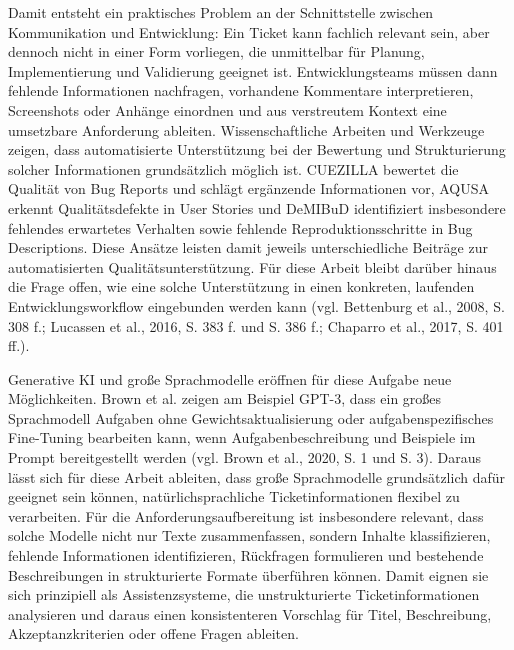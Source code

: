 \documentclass[12pt,a4paper,oneside]{scrreprt}
\begin{document}
Damit entsteht ein praktisches Problem an der Schnittstelle zwischen Kommunikation und Entwicklung: Ein Ticket kann fachlich relevant sein, aber dennoch nicht in einer Form vorliegen, die unmittelbar für Planung, Implementierung und Validierung geeignet ist. Entwicklungsteams müssen dann fehlende Informationen nachfragen, vorhandene Kommentare interpretieren, Screenshots oder Anhänge einordnen und aus verstreutem Kontext eine umsetzbare Anforderung ableiten. Wissenschaftliche Arbeiten und Werkzeuge zeigen, dass automatisierte Unterstützung bei der Bewertung und Strukturierung solcher Informationen grundsätzlich möglich ist. CUEZILLA bewertet die Qualität von Bug Reports und schlägt ergänzende Informationen vor, AQUSA erkennt Qualitätsdefekte in User Stories und DeMIBuD identifiziert insbesondere fehlendes erwartetes Verhalten sowie fehlende Reproduktionsschritte in Bug Descriptions. Diese Ansätze leisten damit jeweils unterschiedliche Beiträge zur automatisierten Qualitätsunterstützung. Für diese Arbeit bleibt darüber hinaus die Frage offen, wie eine solche Unterstützung in einen konkreten, laufenden Entwicklungsworkflow eingebunden werden kann (vgl. Bettenburg et al., 2008, S. 308 f.; Lucassen et al., 2016, S. 383 f. und S. 386 f.; Chaparro et al., 2017, S. 401 ff.).

Generative KI und große Sprachmodelle eröffnen für diese Aufgabe neue Möglichkeiten. Brown et al. zeigen am Beispiel GPT-3, dass ein großes Sprachmodell Aufgaben ohne Gewichtsaktualisierung oder aufgabenspezifisches Fine-Tuning bearbeiten kann, wenn Aufgabenbeschreibung und Beispiele im Prompt bereitgestellt werden (vgl. Brown et al., 2020, S. 1 und S. 3). Daraus lässt sich für diese Arbeit ableiten, dass große Sprachmodelle grundsätzlich dafür geeignet sein können, natürlichsprachliche Ticketinformationen flexibel zu verarbeiten. Für die Anforderungsaufbereitung ist insbesondere relevant, dass solche Modelle nicht nur Texte zusammenfassen, sondern Inhalte klassifizieren, fehlende Informationen identifizieren, Rückfragen formulieren und bestehende Beschreibungen in strukturierte Formate überführen können. Damit eignen sie sich prinzipiell als Assistenzsysteme, die unstrukturierte Ticketinformationen analysieren und daraus einen konsistenteren Vorschlag für Titel, Beschreibung, Akzeptanzkriterien oder offene Fragen ableiten.
\end{document}
